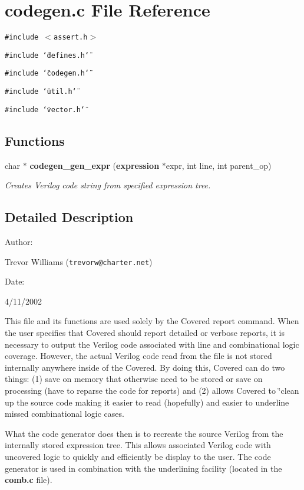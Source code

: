 \section{codegen.c File Reference}
\label{codegen_8c}
{\tt \#include $<$assert.h$>$}\par
{\tt \#include \char`\"{}defines.h\char`\"{}}\par
{\tt \#include \char`\"{}codegen.h\char`\"{}}\par
{\tt \#include \char`\"{}util.h\char`\"{}}\par
{\tt \#include \char`\"{}vector.h\char`\"{}}\par
\subsection*{Functions}
\begin{CompactItemize}
\item 
char $\ast$ {\bf codegen\_\-gen\_\-expr} ({\bf expression} $\ast$expr, int line, int parent\_\-op)
\begin{CompactList}\small\item\em Creates Verilog code string from specified expression tree.\item\end{CompactList}\end{CompactItemize}


\subsection{Detailed Description}


\begin{Desc}
\item[Author: ]\par
Trevor Williams ({\tt trevorw@charter.net}) \end{Desc}
\begin{Desc}
\item[Date: ]\par
4/11/2002

 This file and its functions are used solely by the Covered report command. When the user specifies that Covered should report detailed or verbose reports, it is necessary to output the Verilog code associated with line and combinational logic coverage. However, the actual Verilog code read from the file is not stored internally anywhere inside of the Covered. By doing this, Covered can do two things: (1) save on memory that otherwise need to be stored or save on processing (have to reparse the code for reports) and (2) allows Covered to \char`\"{}clean up the source code making it easier to read (hopefully) and easier to underline missed combinational logic cases.

 What the code generator does then is to recreate the source Verilog from the internally stored expression tree. This allows associated Verilog code with uncovered logic to quickly and efficiently be display to the user. The code generator is used in combination with the underlining facility (located in the {\bf comb.c} file).\end{Desc}


